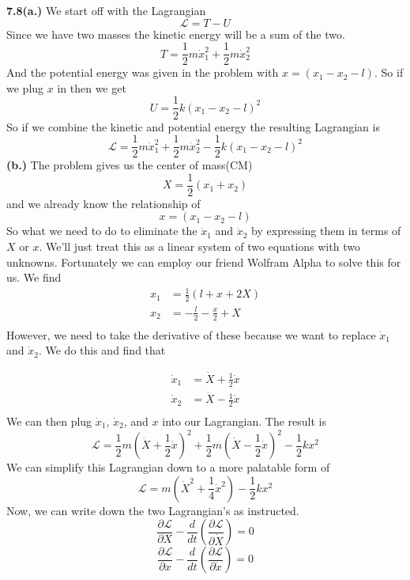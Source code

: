 \documentclass[11pt, leqno]{article}
\begin{document}
\bigskip

\noindent \textbf{7.8(a.)}
We start off with the Lagrangian 
$$
\mathcal{L} = T - U
$$
Since we have two masses the kinetic energy will be a sum of the two. 
$$
T = \frac{1}{2}m \dot{x}_1^2 + \frac{1}{2}m \dot{x}_2^2 
$$
And the potential energy was given in the problem with $x = (x_1 - x_2 - l)$. So if we plug $x$ in then we get 
$$
U = \frac{1}{2}k(x_1 - x_2 - l)^2 
$$
So if we combine the kinetic and potential energy the resulting Lagrangian is 
$$
\boxed{\mathcal{L} = \frac{1}{2}m \dot{x}_1^2 + \frac{1}{2}m \dot{x}_2^2 - \frac{1}{2}k(x_1 - x_2 - l)^2 }
$$
\textbf{(b.)}
The problem gives us the center of mass(CM)
$$
X = \frac{1}{2}(x_1 + x_2)
$$
and we already know the relationship of 
$$ 
x = (x_1 - x_2 - l)
$$
So what we need to do to eliminate the $\dot{x}_1$ and $\dot{x}_2$ by expressing them in terms of $X$ or $x$. We'll just treat this as a linear system of two equations with two unknowns. Fortunately we can employ our friend Wolfram Alpha to solve this for us. We find 
\begin{align*}
x_1 &= \frac{1}{2}(l + x + 2X) \\
x_2 &= -\frac{l}{2} - \frac{x}{2}+X \\
\end{align*}
However, we need to take the derivative of these because we want to replace $\dot{x}_1$ and $\dot{x}_2$. We do this and find that 

\begin{align*}
\dot{x}_1 &= \dot{X} + \frac{1}{2}\dot{x}\\
\dot{x}_2 &= \dot{X} - \frac{1}{2}\dot{x} \\
\end{align*}
We can then plug $\dot{x}_1$, $\dot{x}_2$, and $x$ into our Lagrangian. The result is 
$$
\mathcal{L} = \frac{1}{2}m\left(\dot{X} + \frac{1}{2}\dot{x}\right)^2 + \frac{1}{2}m\left(\dot{X} - \frac{1}{2}\dot{x}\right)^2 - \frac{1}{2}k x^2
$$
We can simplify this Lagrangian down to a more palatable form of 
$$
\mathcal{L} = m\left(\dot{X}^2 + \frac{1}{4}\dot{x}^2\right) - \frac{1}{2}kx^2
$$
Now, we can write down the two Lagrangian's as instructed.  
\begin{equation}
\frac{\partial \mathcal{L}}{\partial X} - \frac{d}{dt}\left(\frac{\partial \mathcal{L}}{\partial \dot{X}}\right) = 0 
\end{equation}
\begin{equation}
\frac{\partial \mathcal{L}}{\partial x} - \frac{d}{dt}\left(\frac{\partial \mathcal{L}}{\partial \dot{x}}\right) = 0
\end{equation}
\end{document}

